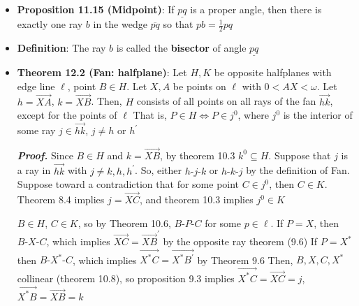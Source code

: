 \documentclass{report}
\begin{document}
\begin{itemize}
            \item \textbf{Proposition 11.15 (Midpoint)}: If $\underline{pq}$ is a proper angle, then there is exactly one ray $b$ in the wedge $\overline{pq}$ so that $pb  = \frac{1}{2}pq $
            \item \textbf{Definition}: The ray $b$ is called the \textbf{bisector} of angle $\underline{pq}$ 
            \item \textbf{Theorem 12.2 (Fan: halfplane)}: Let $H,K$ be opposite halfplanes with edge line $\ell$, point $B \in H$. Let $X,A$ be points on $\ell$ with $0 < AX < \omega$. Let $h = \overrightarrow{XA}$, $k = \overrightarrow{XB}$. Then, $H $ consists of all points on all rays of the fan $\overrightarrow{hk}$, except for the points of $\ell$
                \bigbreak \noindent 
                That is, $P \in H \iff P \in j^{0}$, where $j^{0}$ is the interior of some ray $j \in \overrightarrow{hk}$, $j \ne h$ or $h^{\prime}$
                \bigbreak \noindent 
                \begin{figure}[ht]
                    \centering
                    \label{fig:figher}
                \end{figure}
                \bigbreak \noindent 
                \textbf{\textit{Proof.}} Since $B \in H$ and $k = \overrightarrow{XB}$, by theorem 10.3 $k^{0} \subseteq H$. Suppose that $j$ is a ray in $\overrightarrow{hk}$ with $j\ne k,h,h^{\prime}$. So, either $ h\text{-}j\text{-}k$ or $ h\text{-}k\text{-}j$ by the definition of Fan.
                \bigbreak \noindent 
                Suppose toward a contradiction that for some point $C \in j^{0}$, then $C \in K$. Theorem 8.4 implies $j = \overrightarrow{XC}$, and theorem 10.3 implies $j^{0} \in K$
                \bigbreak \noindent 
                \begin{figure}[ht]
                    \centering
                    \label{fig:ok}
                \end{figure}
                \bigbreak \noindent 
                $B \in H$, $C \in K$, so by Theorem 10.6, $ B\text{-}P\text{-}C$ for some $p \in \ell$. If $P =X$, then $ B\text{-}X\text{-}C$, which implies $ \overrightarrow{XC} = \overrightarrow{XB}^{\prime}$ by the opposite ray theorem (9.6)
                \bigbreak \noindent 
                If $P=X^{*}$ then $ B\text{-}X^{*}\text{-}C$, which implies $ \overrightarrow{X^{*}C} = \overrightarrow{X^{*}B^{\prime}}$ by Theorem 9.6
                \bigbreak \noindent 
                Then, $ B,X,C,X^{*}$ collinear (theorem 10.8), so proposition 9.3 implies $ \overrightarrow{X^{*}C} = \overrightarrow{XC} = j$, $ \overrightarrow{X^{*}B} = \overrightarrow{XB} = k$

\end{itemize}
\end{document}
